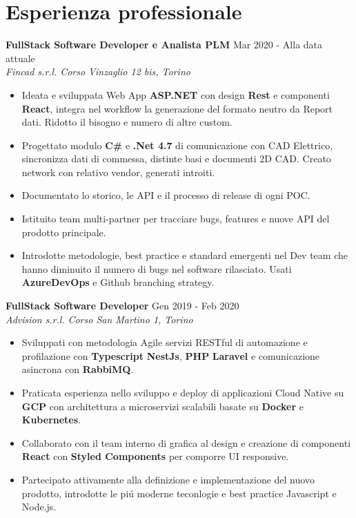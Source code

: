 \documentclass[10pt]{article}
\begin{document}
\section{Esperienza professionale}
\noindent \large\textbf{FullStack Software Developer e Analista PLM} \hfill Mar 2020 - Alla data attuale \\
\textit{Fincad s.r.l.} \hfill \textit{Corso Vinzaglio 12 bis, Torino}
\begin{itemize}[noitemsep,nolistsep,leftmargin=1em]
	\item Ideata e sviluppata Web App \textbf{ASP.NET} con design \textbf{Rest} e componenti \textbf{React},
	      integra nel workflow la generazione del formato neutro da Report dati. 
	      Ridotto il bisogno e numero di altre custom.
	\item Progettato modulo \textbf{C\#} e \textbf{.Net 4.7} di comunicazione con CAD Elettrico,
	      sincronizza dati di commessa, distinte basi e documenti 2D CAD.	
	      Creato network con relativo vendor, generati introiti.
	\item Documentato lo storico, le API e il processo di release di ogni POC.
	\item Istituito team multi-partner per tracciare bugs, features e nuove API del prodotto principale.
	\item Introdotte metodologie, best practice e standard emergenti nel Dev team che hanno diminuito il numero di bugs nel software rilasciato.
	      Usati \textbf{AzureDevOps} e Github branching strategy.
\end{itemize}

\vspace{0.4em}

\noindent \large\textbf{FullStack Software Developer} \hfill Gen 2019 - Feb 2020\\
\textit{Advision s.r.l.} \hfill \textit{Corso San Martino 1, Torino}
\begin{itemize}[noitemsep,nolistsep,leftmargin=1em]
	\item Sviluppati con metodologia Agile servizi RESTful di automazione e profilazione con \textbf{Typescript} \textbf{NestJs}, \textbf{PHP} \textbf{Laravel} e comunicazione asincrona con \textbf{RabbiMQ}.
	\item Praticata esperienza nello sviluppo e deploy di applicazioni Cloud Native su \textbf{GCP} con architettura a microservizi scalabili basate su \textbf{Docker} e \textbf{Kubernetes}.
	\item Collaborato con il team interno di grafica al design e creazione di componenti \textbf{React} con \textbf{Styled Components} per comporre UI responsive.
	\item Partecipato attivamente alla definizione e implementazione del nuovo prodotto, introdotte le pi\'u moderne teconlogie e best practice Javascript e Node.js.
\end{itemize}
\end{document}
